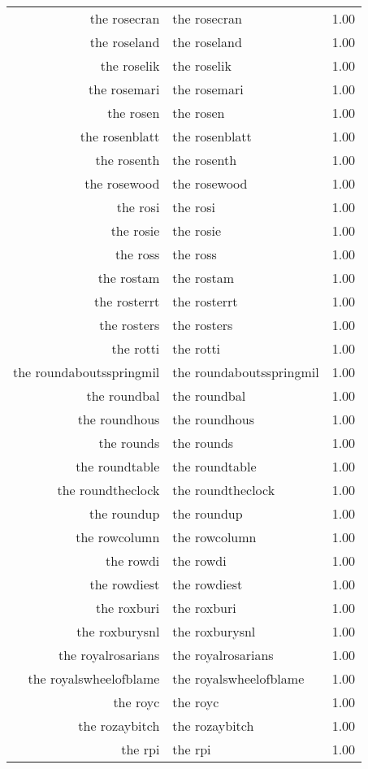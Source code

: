 \begin{table}[ht]
\begin{tabular}{rlr}
  the rosecran & the rosecran & 1.00 \\ 
  the roseland & the roseland & 1.00 \\ 
  the roselik & the roselik & 1.00 \\ 
  the rosemari & the rosemari & 1.00 \\ 
  the rosen & the rosen & 1.00 \\ 
  the rosenblatt & the rosenblatt & 1.00 \\ 
  the rosenth & the rosenth & 1.00 \\ 
  the rosewood & the rosewood & 1.00 \\ 
  the rosi & the rosi & 1.00 \\ 
  the rosie & the rosie & 1.00 \\ 
  the ross & the ross & 1.00 \\ 
  the rostam & the rostam & 1.00 \\ 
  the rosterrt & the rosterrt & 1.00 \\ 
  the rosters & the rosters & 1.00 \\ 
  the rotti & the rotti & 1.00 \\ 
  the roundaboutsspringmil & the roundaboutsspringmil & 1.00 \\ 
  the roundbal & the roundbal & 1.00 \\ 
  the roundhous & the roundhous & 1.00 \\ 
  the rounds & the rounds & 1.00 \\ 
  the roundtable & the roundtable & 1.00 \\ 
  the roundtheclock & the roundtheclock & 1.00 \\ 
  the roundup & the roundup & 1.00 \\ 
  the rowcolumn & the rowcolumn & 1.00 \\ 
  the rowdi & the rowdi & 1.00 \\ 
  the rowdiest & the rowdiest & 1.00 \\ 
  the roxburi & the roxburi & 1.00 \\ 
  the roxburysnl & the roxburysnl & 1.00 \\ 
  the royalrosarians & the royalrosarians & 1.00 \\ 
  the royalswheelofblame & the royalswheelofblame & 1.00 \\ 
  the royc & the royc & 1.00 \\ 
  the rozaybitch & the rozaybitch & 1.00 \\ 
  the rpi & the rpi & 1.00 \\ 

\end{tabular}
\end{table}
